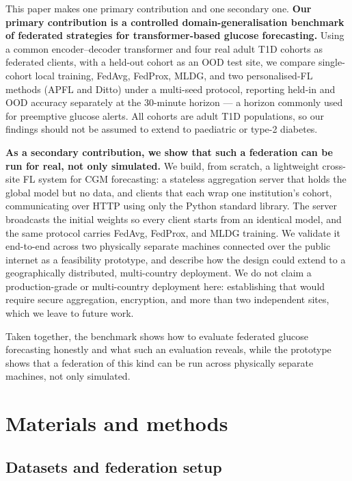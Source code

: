 \documentclass[10pt,letterpaper]{article}
\begin{document}
This paper makes one primary contribution and one secondary one. \textbf{Our
primary contribution is a controlled domain-generalisation benchmark of federated
strategies for transformer-based glucose forecasting.} Using a common
encoder--decoder transformer and four real adult T1D cohorts as federated
clients, with a held-out cohort as an OOD test site, we compare single-cohort
local training, FedAvg, FedProx, MLDG, and two personalised-FL methods (APFL and
Ditto) under a multi-seed protocol, reporting held-in and OOD accuracy separately
at the 30-minute horizon --- a horizon commonly used for preemptive glucose
alerts. All cohorts are adult T1D populations, so our findings should not be
assumed to extend to paediatric or type-2 diabetes.

\textbf{As a secondary contribution, we show that such a federation can be run for
real, not only simulated.} We build, from scratch, a lightweight cross-site FL
system for CGM forecasting: a stateless aggregation server that holds the global
model but no data, and clients that each wrap one institution's cohort,
communicating over HTTP using only the Python standard library. The server
broadcasts the initial weights so every client starts from an identical model, and
the same protocol carries FedAvg, FedProx, and MLDG training. We validate it
end-to-end across two physically separate machines connected over the public
internet as a feasibility prototype, and describe how the design could extend to
a geographically distributed, multi-country deployment. We do not claim a
production-grade or multi-country deployment here: establishing that would
require secure aggregation, encryption, and more than two independent sites,
which we leave to future work.

Taken together, the benchmark shows how to evaluate federated glucose
forecasting honestly and what such an evaluation reveals, while the prototype
shows that a federation of this kind can be run across physically separate
machines, not only simulated.

\section*{Materials and methods}

\subsection*{Datasets and federation setup}
\end{document}

